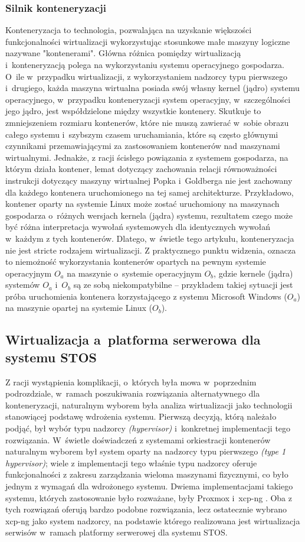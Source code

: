 \subsubsection{Silnik konteneryzacji}
Konteneryzacja to technologia, pozwalająca na uzyskanie większości funkcjonalności wirtualizacji wykorzystując stosunkowe małe maszyny logiczne nazywane "kontenerami". Główna różnica pomiędzy wirtualizacją i~konteneryzacją polega na wykorzystaniu systemu operacyjnego gospodarza. O~ile w~przypadku wirtualizacji, z wykorzystaniem nadzorcy typu pierwszego i~drugiego, każda maszyna wirtualna posiada swój własny kernel (jądro) systemu operacyjnego, w~przypadku konteneryzacji system operacyjny, w~szczególności jego jądro, jest współdzielone między wszystkie kontenery. Skutkuje to zmniejszeniem rozmiaru kontenerów, które nie muszą zawierać w~sobie obrazu całego systemu i~szybszym czasem uruchamiania, które są często głównymi czynnikami przemawiającymi za zastosowaniem kontenerów nad maszynami wirtualnymi. Jednakże, z racji ścisłego powiązania z systemem gospodarza, na którym działa kontener, lemat dotyczący zachowania relacji równoważności instrukcji dotyczący maszyny wirtualnej Popka i~Goldberga \cite{virtualization} nie jest zachowany dla każdego kontenera uruchomionego na tej samej architekturze. Przykładowo, kontener oparty na systemie Linux może zostać uruchomiony na maszynach gospodarza o~różnych wersjach kernela (jądra) systemu, rezultatem czego może być różna interpretacja wywołań systemowych dla identycznych wywołań w~każdym z tych kontenerów. Dlatego, w~świetle tego artykułu, konteneryzacja nie jest stricte rodzajem wirtualizacji. Z praktycznego punktu widzenia, oznacza to niemożność wykorzystania kontenerów opartych na pewnym systemie operacyjnym $O_a$ na maszynie o~systemie operacyjnym $O_b$, gdzie kernele (jądra) systemów $O_a$ i~$O_b$ są ze sobą niekompatybilne -- przykładem takiej sytuacji jest próba uruchomienia kontenera korzystającego z systemu Microsoft Windows ($O_a$) na maszynie opartej na systemie Linux ($O_b$).

\subsection{Wirtualizacja a~platforma serwerowa dla systemu STOS}
Z racji wystąpienia komplikacji, o~których była mowa w~poprzednim podrozdziale, w~ramach poszukiwania rozwiązania alternatywnego dla konteneryzacji, naturalnym wyborem była analiza wirtualizacji jako technologii stanowiącej podstawę wdrożenia systemu. Pierwszą decyzją, którą należało podjąć, był wybór typu nadzorcy \textit{(hypervisor)} i~konkretnej implementacji tego rozwiązania. W~świetle doświadczeń z systemami orkiestracji kontenerów naturalnym wyborem był system oparty na nadzorcy typu pierwszego \textit{(type 1 hypervisor)}; wiele z implementacji tego właśnie typu nadzorcy oferuje funkcjonalności z zakresu zarządzania wieloma maszynami fizycznymi, co było jednym z wymagań dla wdrożonego systemu. Dwiema implementacjami takiego systemu, których zastosowanie było rozważane, były Proxmox i~xcp-ng \cite{proxmox, xcp}. Oba z tych rozwiązań oferują bardzo podobne rozwiązania, lecz ostatecznie wybrano xcp-ng jako system nadzorcy, na podstawie którego realizowana jest wirtualizacja serwisów w~ramach platformy serwerowej dla systemu STOS.
